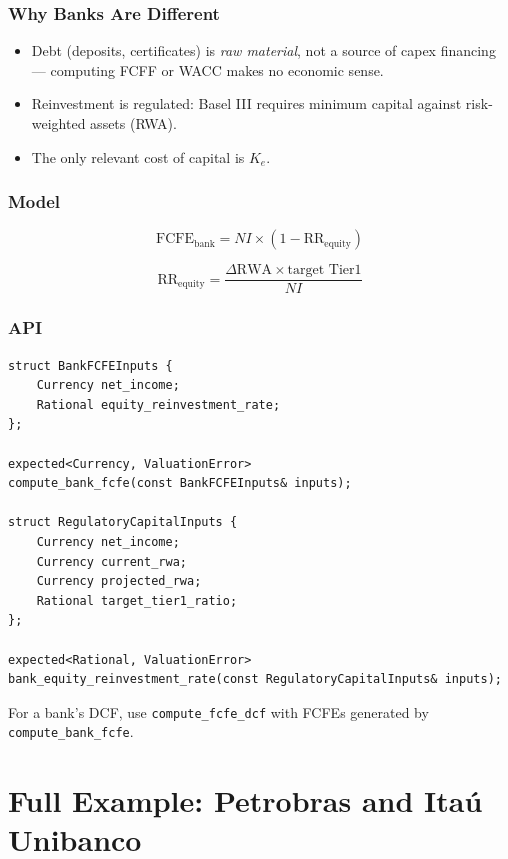 \documentclass[12pt, a4paper, oneside]{book}
\newcommand{\FCFE}{\ensuremath{\mathrm{FCFE}}}
\newcommand{\Ke}{K_e}
\newcommand{\RR}{\mathrm{RR}}
\begin{document}
\subsection{Why Banks Are Different}

\begin{itemize}
  \item Debt (deposits, certificates) is \emph{raw material}, not a source of
        capex financing --- computing FCFF or WACC makes no economic sense.
  \item Reinvestment is regulated: Basel III requires minimum capital against
        risk-weighted assets (RWA).
  \item The only relevant cost of capital is $\Ke$.
\end{itemize}

\subsection{Model}

\begin{equation}
  \FCFE_{\text{bank}} = NI \times (1 - \RR_{\text{equity}})
\end{equation}

\[
  \RR_{\text{equity}} = \frac{\Delta \text{RWA} \times \text{target Tier1}}{NI}
\]

\subsection{API}

\begin{lstlisting}[style=cpp]
struct BankFCFEInputs {
    Currency net_income;
    Rational equity_reinvestment_rate;
};

expected<Currency, ValuationError>
compute_bank_fcfe(const BankFCFEInputs& inputs);

struct RegulatoryCapitalInputs {
    Currency net_income;
    Currency current_rwa;
    Currency projected_rwa;
    Rational target_tier1_ratio;
};

expected<Rational, ValuationError>
bank_equity_reinvestment_rate(const RegulatoryCapitalInputs& inputs);
\end{lstlisting}

For a bank's DCF, use \texttt{compute\_fcfe\_dcf} with FCFEs generated by
\texttt{compute\_bank\_fcfe}.

\chapter{Full Example: Petrobras and Itaú Unibanco}
\end{document}
